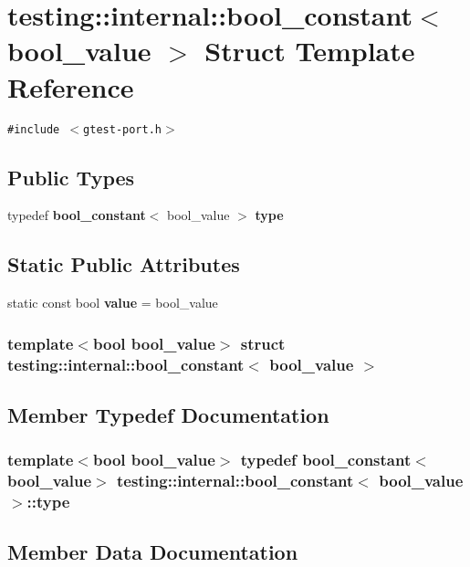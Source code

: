 \section{testing::internal::bool\_\-constant$<$ bool\_\-value $>$ Struct Template Reference}
\label{structtesting_1_1internal_1_1bool__constant}
{\tt \#include $<$gtest-port.h$>$}

\subsection*{Public Types}
\begin{CompactItemize}
\item 
typedef {\bf bool\_\-constant}$<$ bool\_\-value $>$ {\bf type}
\end{CompactItemize}
\subsection*{Static Public Attributes}
\begin{CompactItemize}
\item 
static const bool {\bf value} = bool\_\-value
\end{CompactItemize}
\subsubsection*{template$<$bool bool\_\-value$>$ struct testing::internal::bool\_\-constant$<$ bool\_\-value $>$}



\subsection{Member Typedef Documentation}
\subsubsection{\setlength{\rightskip}{0pt plus 5cm}template$<$bool bool\_\-value$>$ typedef {\bf bool\_\-constant}$<$bool\_\-value$>$ {\bf testing::internal::bool\_\-constant}$<$ bool\_\-value $>$::{\bf type}}\label{structtesting_1_1internal_1_1bool__constant_1613a5cefa36e8be056e47179f6725a8}




\subsection{Member Data Documentation}
